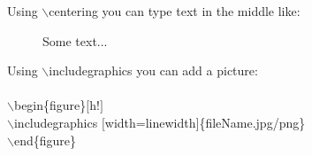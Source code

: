 \documentclass{article}
\begin{document}
Using $\backslash$centering you can type text in the middle like:
\begin{figure}[h!]
\centering
Some text...
\end{figure}

Using $\backslash$includegraphics you can add a picture:\\ \\
$\backslash$begin\{figure\}$[$h!$]$\\
$\backslash$includegraphics $[$width=linewidth$]$\{fileName.jpg/png\}\\
$\backslash$end\{figure\}

\end{document}
